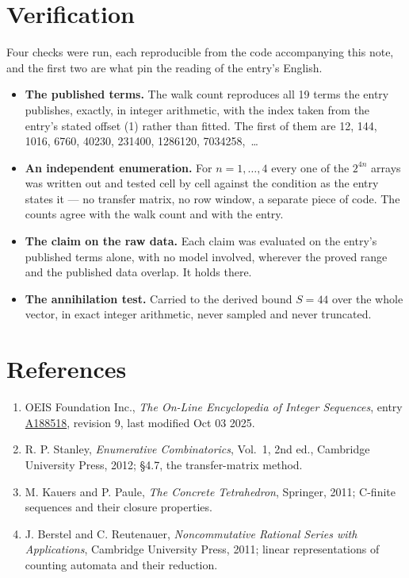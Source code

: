 \documentclass[11pt]{article}
\theoremstyle{definition}
\begin{document}
\section{Verification}

Four checks were run, each reproducible from the code accompanying this note, and the first two are what pin the reading of the entry's English.

\begin{itemize}

\item {\bfseries The published terms.} The walk count reproduces all 19 terms the entry publishes, exactly, in integer arithmetic, with the index taken from the entry's stated offset (1) rather than fitted. The first of them are 12, 144, 1016, 6760, 40230, 231400, 1286120, 7034258,~\dots

\item {\bfseries An independent enumeration.} For $n = 1,\dots,4$ every one of the $2^{4n}$ arrays was written out and tested cell by cell against the condition as the entry states it --- no transfer matrix, no row window, a separate piece of code. The counts agree with the walk count and with the entry.

\item {\bfseries The claim on the raw data.} Each claim was evaluated on the entry's published terms alone, with no model involved, wherever the proved range and the published data overlap. It holds there.

\item {\bfseries The annihilation test.} Carried to the derived bound $S = 44$ over the whole vector, in exact integer arithmetic, never sampled and never truncated.

\end{itemize}

\section{References}

\begin{enumerate}

\item OEIS Foundation Inc., \emph{The On-Line Encyclopedia of Integer Sequences}, entry \href{https://oeis.org/A188518}{A188518}, revision 9, last modified Oct 03 2025.

\item R. P. Stanley, \emph{Enumerative Combinatorics}, Vol.~1, 2nd ed., Cambridge University Press, 2012; \S4.7, the transfer-matrix method.

\item M. Kauers and P. Paule, \emph{The Concrete Tetrahedron}, Springer, 2011; C-finite sequences and their closure properties.

\item J. Berstel and C. Reutenauer, \emph{Noncommutative Rational Series with Applications}, Cambridge University Press, 2011; linear representations of counting automata and their reduction.

\end{enumerate}
\end{document}
